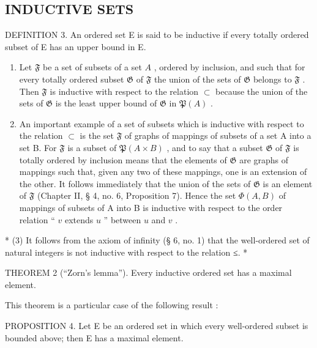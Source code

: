 \subsection{INDUCTIVE SETS}

DEFINITION 3. An ordered set E is said to be inductive if every totally ordered subset of E has an upper bound in E.


\begin{enumerate}
\def\labelenumi{(\arabic{enumi})}
\item
  Let \(\mathfrak{F}\) be a set of subsets of a set \(A\) , ordered by inclusion, and such that for every totally ordered subset \(\mathfrak{G}\) of \(\mathfrak{F}\) the union of the sets of \(\mathfrak{G}\) belongs to \(\mathfrak{F}\) . Then \(\mathfrak{F}\) is inductive with respect to the relation \(\subset\) because the union of the sets of \(\mathfrak{G}\) is the least upper bound of \(\mathfrak{G}\) in \(\mathfrak{P}(A)\) .
\item
  An important example of a set of subsets which is inductive with respect to the relation \(\subset\) is the set \(\mathfrak{F}\) of graphs of mappings of subsets of a set A into a set B. For \(\mathfrak{F}\) is a subset of \(\mathfrak{P}(A \times B)\) , and to say that a subset \(\mathfrak{G}\) of \(\mathfrak{F}\) is totally ordered by inclusion means that the elements of \(\mathfrak{G}\) are graphs of mappings such that, given any two of these mappings, one is an extension of the other. It follows immediately that the union of the sets of \(\mathfrak{G}\) is an element of \(\mathfrak{F}\) (Chapter II, § 4, no. 6, Proposition 7). Hence the set \(\Phi(A, B)\) of mappings of subsets of A into B is inductive with respect to the order relation `` \(v\) extends \(u\) '' between \(u\) and \(v\) .
\end{enumerate}

* (3) It follows from the axiom of infinity (§ 6, no. 1) that the well-ordered set of natural integers is not inductive with respect to the relation ≤. *

THEOREM 2 (``Zorn's lemma''). Every inductive ordered set has a maximal element.

This theorem is a particular case of the following result :

PROPOSITION 4. Let E be an ordered set in which every well-ordered subset is bounded above; then E has a maximal element.

